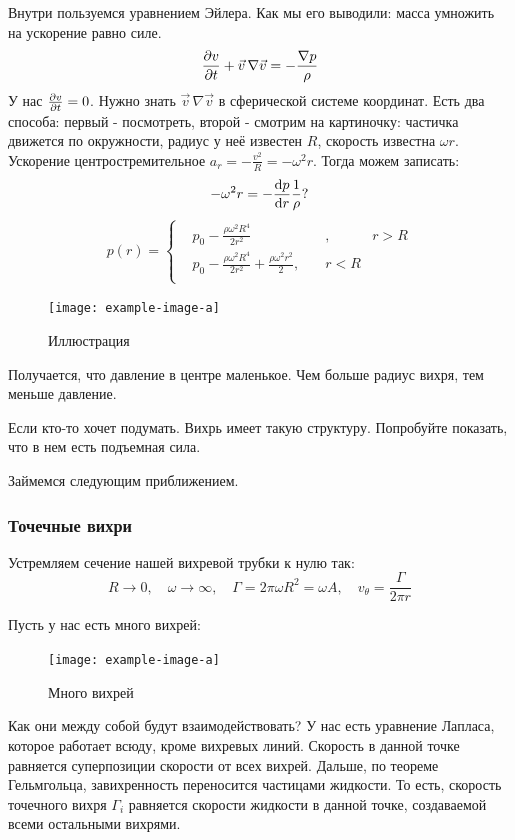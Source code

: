 Внутри пользуемся уравнением Эйлера. Как мы его выводили: масса умножить на ускорение равно силе.
\begin{equation}
	\pdv{v}{t}+\vec{v}\,\nabla\vec{v}=-\frac{\nabla p}{\rho}
\end{equation}
У нас $\pdv{v}{t}=0$. Нужно знать $\vec{v}\,\nabla\vec{v}$ в сферической системе координат. Есть два способа: первый - посмотреть, второй - смотрим на картиночку: частичка движется по окружности, радиус у неё известен $R$, скорость известна $\omega r$. Ускорение центростремительное $a_r=-\frac{v^2}{R}=-\omega^2 r$. Тогда можем записать:
\begin{equation}
	-\omega^2 r  = - \dv{p}{r}\frac{1}{\rho}?
\end{equation}
\begin{equation}
	p(r)=\left\{
	\begin{aligned}
		&p_0-\frac{\rho\omega^2 R^4}{2r^2}&, \quad& r>R\\
		&p_0-\frac{\rho\omega^2 R^4}{2r^2}+\frac{\rho\omega^2 r^2}{2}, \quad& r<R\\
	\end{aligned}
	\right.
\end{equation}
\begin{figure}[h!]
    \centering
    \texttt{[image: example-image-a]}
    \caption{Иллюстрация}
    \label{fig:figure1}
\end{figure}
Получается, что давление в центре маленькое. Чем больше радиус вихря, тем меньше давление.


Если кто-то хочет подумать. Вихрь имеет такую \/ структуру. Попробуйте показать, что в нем есть подъемная сила.


Займемся следующим приближением.
\subsubsection{Точечные вихри}

Устремляем сечение нашей вихревой трубки к нулю так:
\begin{equation}
	R\to0, \quad \omega\to\infty, \quad \Gamma=2\pi \omega R^2 =\omega A, \quad v_\theta=\frac{\Gamma}{2\pi r}
\end{equation}

Пусть у нас есть много вихрей: 
\begin{figure}[h!]
    \centering
    \texttt{[image: example-image-a]}
    \caption{Много вихрей}
    \label{fig:figure1}
\end{figure}
Как они между собой будут взаимодействовать? У нас есть уравнение Лапласа, которое работает всюду, кроме вихревых линий. Скорость в данной точке равняется суперпозиции скорости от всех вихрей. Дальше, по теореме Гельмгольца, завихренность переносится частицами жидкости. То есть, скорость точечного вихря $\Gamma_i$ равняется скорости жидкости в данной точке, создаваемой всеми остальными вихрями. 

